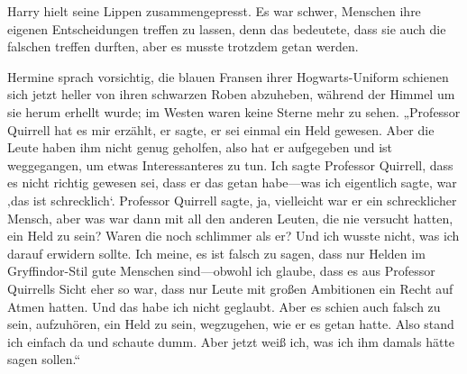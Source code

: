 Harry hielt seine Lippen zusammengepresst. Es war schwer, Menschen ihre eigenen Entscheidungen treffen zu lassen, denn das bedeutete, dass sie auch die falschen treffen durften, aber es musste trotzdem getan werden.

Hermine sprach vorsichtig, die blauen Fransen ihrer Hogwarts-Uniform schienen sich jetzt heller von ihren schwarzen Roben abzuheben, während der Himmel um sie herum erhellt wurde; im Westen waren keine Sterne mehr zu sehen.
„Professor Quirrell hat es mir erzählt, er sagte, er sei einmal ein Held gewesen. Aber die Leute haben ihm nicht genug geholfen, also hat er aufgegeben und ist weggegangen, um etwas Interessanteres zu tun. Ich sagte Professor Quirrell, dass es nicht richtig gewesen sei, dass er das getan habe—was ich eigentlich sagte, war ‚das ist schrecklich‘. Professor Quirrell sagte, ja, vielleicht war er ein schrecklicher Mensch, aber was war dann mit all den anderen Leuten, die nie versucht hatten, ein Held zu sein? Waren die noch schlimmer als er? Und ich wusste nicht, was ich darauf erwidern sollte. Ich meine, es ist falsch zu sagen, dass nur Helden im Gryffindor-Stil gute Menschen sind—obwohl ich glaube, dass es aus Professor Quirrells Sicht eher so war, dass nur Leute mit großen Ambitionen ein Recht auf Atmen hatten. Und das habe ich nicht geglaubt. Aber es schien auch falsch zu sein, aufzuhören, ein Held zu sein, wegzugehen, wie er es getan hatte. Also stand ich einfach da und schaute dumm. Aber jetzt weiß ich, was ich ihm damals hätte sagen sollen.“

